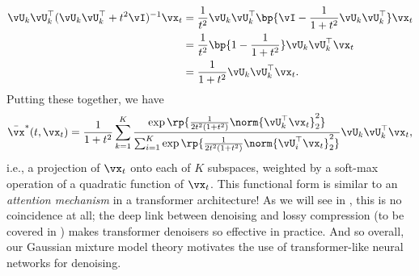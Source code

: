 \documentclass[../../book-main.tex]{subfiles}
\begin{document}
{\begin{align}
	\vU_{k}\vU_{k}^{\top}(\vU_{k}\vU_{k}^{\top} + t^{2}\vI)^{-1}\vx_{t} 
	&= \frac{1}{t^{2}}\vU_{k}\vU_{k}^{\top}\bp{\vI - \frac{1}{1 + t^{2}}\vU_{k}\vU_{k}^{\top}}\vx_{t} \\
	&= \frac{1}{t^{2}}\bp{1 - \frac{1}{1 + t^{2}}}\vU_{k}\vU_{k}^{\top}\vx_{t} \\
	&= \frac{1}{1 + t^{2}}\vU_{k}\vU_{k}^{\top}\vx_{t}.
\end{align}
Putting these together, we have 
\begin{equation}\label{eq:gmm_lowrank_denoiser}
	\bar{\vx}^{\ast}(t, \vx_{t}) = \frac{1}{1 + t^{2}}\sum_{k = 1}^{K}\frac{\exp\rp{\frac{1}{2t^{2}(1 + t^{2})}\norm{\vU_{k}^{\top}\vx_{t}}_{2}^{2}}}{\sum_{i = 1}^{K}\exp\rp{\frac{1}{2t^{2}(1 + t^{2})}\norm{\vU_{i}^{\top}\vx_{t}}_{2}^{2}}}\vU_{k}\vU_{k}^{\top}\vx_{t},
\end{equation}
i.e., a projection of \(\vx_{t}\) onto each of \(K\) subspaces, weighted by a soft-max operation of a quadratic function of \(\vx_{t}\). This functional form is similar to an \textit{attention mechanism} in a transformer architecture! As we will see in , this is no coincidence at all; the deep link between denoising and lossy compression (to be covered in ) makes transformer denoisers so effective in practice. And so overall, our Gaussian mixture model theory motivates the use of transformer-like neural networks for denoising.
} 
\end{document}
